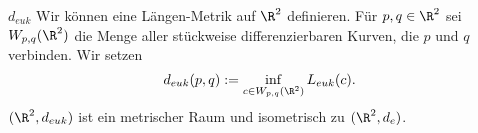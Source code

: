 \begin{karte}{\(d_{euk}\)}
    Wir können eine Längen-Metrik auf \(\R^2\) definieren. Für 
    \(p,q\in \R^2\) sei \(W_{p,q}(\R^2)\) die Menge aller stückweise differenzierbaren 
    Kurven, die \(p\) und \(q\) verbinden. Wir setzen 
    \[ d_{euk}(p,q) := \inf_{c\in W_{p,q}(\R^2)} L_{euk}(c). \]
    \((\R^2, d_{euk})\) ist ein metrischer Raum und isometrisch zu \((\R^2, d_e)\).
\end{karte}